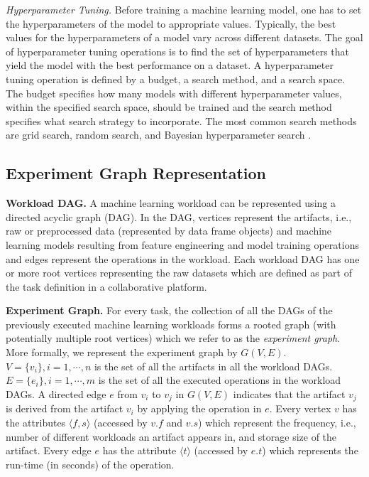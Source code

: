 \textit{Hyperparameter Tuning.}
Before training a machine learning model, one has to set the hyperparameters of the model to appropriate values.
Typically, the best values for the hyperparameters of a model vary across different datasets.
The goal of hyperparameter tuning operations is to find the set of hyperparameters that yield the model with the best performance on a dataset.
A hyperparameter tuning operation is defined by a budget, a search method, and a search space.
The budget specifies how many models with different hyperparameter values, within the specified search space, should be trained and the search method specifies what search strategy to incorporate.
The most common search methods are grid search, random search, and Bayesian hyperparameter search \cite{bergstra2012random,snoek2012practical}.

\subsection{Experiment Graph Representation}\label{sub-graph-construction}
\textbf{Workload DAG.}
A machine learning workload can be represented using a directed acyclic graph (DAG).
In the DAG, vertices represent the artifacts, i.e., raw or preprocessed data (represented by data frame objects) and machine learning models resulting from feature engineering and model training operations and edges represent the operations in the workload.
Each workload DAG has one or more root vertices representing the raw datasets which are defined as part of the task definition in a collaborative platform.

\textbf{Experiment Graph. }
For every task, the collection of all the DAGs of the previously executed machine learning workloads forms a rooted graph (with potentially multiple root vertices) which we refer to as the \textit{experiment graph}.
More formally, we represent the experiment graph by $G(V, E)$.
$V=\{v_i\}, i = 1, \cdots, n$ is the set of all the artifacts in all the workload DAGs.
$E=\{e_i\}, i = 1, \cdots, m$ is the set of all the executed operations in the workload DAGs.
A directed edge $e$ from $v_i$ to $v_j$ in $G(V, E)$ indicates that the artifact $v_j$ is derived from the artifact $v_i$ by applying the operation in $e$.
Every vertex $v$ has the attributes $\langle f, s \rangle$ (accessed by $v.f$ and $v.s$) which represent the frequency, i.e., number of different workloads an artifact appears in, and storage size of the artifact.
Every edge $e$ has the attribute $\langle t \rangle$ (accessed by $e.t$) which represents the run-time (in seconds) of the operation.

